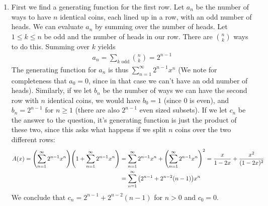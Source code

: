 \documentclass[12pt]{article}
\theoremstyle{definitionstyle}
\begin{document}
\begin{enumerate}[leftmargin=\labelsep]
	\item First we find a generating function for the first row. Let $a_n$ be the number of ways to have $n$ identical coins, each lined up in a row, with an odd number of heads. We can evaluate $a_n$ by summing over the number of heads. Let $1 \leq k \leq n$ be odd and the number of heads in our row. There are ${n \choose k}$ ways to do this. Summing over $k$ yields
	\begin{align*}
		a_n = \sum_{k \text{ odd}} {n \choose k} = 2^{n-1}
	\end{align*}
	The generating function for $a_n$ is thus $\sum_{n=1}^\infty 2^{n-1} x^n$ (We note for completeness that $a_0 = 0$, since in that case we can't have an odd number of heads). Similarly, if we let $b_n$ be the number of ways we can have the second row with $n$ identical coins, we would have $b_0 = 1$ (since 0 is even), and $b_n = 2^{n-1}$ for $n \geq 1$ (there are also $2^{n-1}$ even sized subsets). If we let $c_n$ be the answer to the question, it's generating function is just the product of these two, since this asks what happens if we split $n$ coins over the two different rows:
	\begin{align*}
		A(x) = \qty(\sum_{n=1}^\infty 2^{n-1}x^n)\qty(1+\sum_{n=1}^\infty 2^{n-1}x^n) &= \sum_{n=1}^\infty 2^{n-1}x^n + \qty(\sum_{n=1}^\infty 2^{n-1}x^n)^2 = \frac{x}{1-2x} + \frac{x^2}{(1-2x)^2} \\
		&= \sum_{n=1}^\infty \qty(2^{n-1} + 2^{n-2}(n-1))x^n
	\end{align*}
	We conclude that $c_n = 2^{n-1} + 2^{n-2}(n-1)$ for $n > 0$ and $c_0 = 0$.
	

\end{enumerate}
\end{document}
